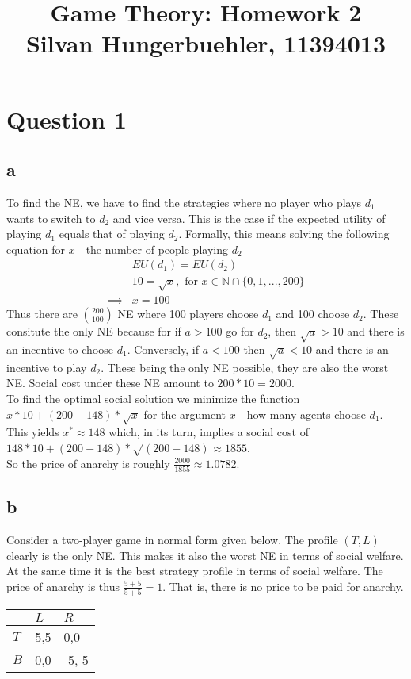 \documentclass[10pt,a4paper]{article}
\title{%
  Game Theory: Homework 2 \\
  \large Silvan Hungerbuehler, 11394013}
\date{}
\begin{document}
\maketitle

\section*{Question 1}
\subsection*{a}
To find the NE, we have to find the strategies where no player who plays $d_1$ wants to switch to $d_2$ and vice versa. This is the case if the expected utility of playing $d_1$ equals that of playing $d_2$. Formally, this means solving the following equation for $x$ - the number of people playing $d_2$
\begin{align*}
&EU(d_1)=EU(d_2)\\
&10=\sqrt{x}, \text{ for } x\in \mathbb{N}\cap \{0,1,...,200\}\\
\implies &x = 100
\end{align*}
Thus there are $\binom{200}{100}$ NE where 100 players choose $d_1$ and 100 choose $d_2$. These consitute the only NE because for if $a>100$ go for $d_2$, then $\sqrt{a}>10$ and there is an incentive to choose $d_1$. Conversely, if $a<100$ then $\sqrt{a}<10$ and there is an incentive to play $d_2$. These being the only NE possible, they are also the worst NE. Social cost under these NE amount to $200*10=2000$.\\
To find the optimal social solution we minimize the function $x*10+(200-148) * \sqrt{x}$ for the argument $x$ - how many agents choose $d_1$.
 This yields $x^* \approx 148$ which,  in its turn, implies a social cost of $148 * 10 + (200-148)* \sqrt{(200-148)} \approx 1855$.\\
So the price of anarchy is roughly $\tfrac{2000}{1855}\approx 1.0782$.
\subsection*{b}
Consider a two-player game in normal form given below. The profile $(T,L)$ clearly is the only NE. This makes it also the worst NE in terms of social welfare. At the same time it is the best strategy profile in terms of social welfare. The price of anarchy is thus $\tfrac{5+5}{5+5}=1$. That is, there is no price to be paid for anarchy.
\begin{table}[h]
\begin{tabular}{|l|l|l|}
\hline
          & $L$ & $R$  \\ \hline
$T$     & 5,5   & 0,0   \\ \hline
$B$     & 0,0  & -5,-5  \\ \hline
\end{tabular}
\end{table}
\end{document}
